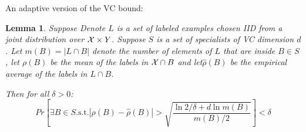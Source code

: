 \documentclass{article}
\newtheorem{lemma}[theorem]{Lemma}
\newcommand{\X}{{\cal X}}
\newcommand{\emprho}{\hat{\rho}}
\begin{document}
An adaptive version of the VC bound:
\begin{lemma}
Suppose Denote $L$ is a set of labeled examples chosen IID from a
joint distribution over $\X \times Y$. Suppose $S$ is a set of
specialists of VC dimension $d$.
Let $m(B)=|L \cap B|$ denote the number of elements of $L$ that are
inside $B \in S$, let $\rho(B)$ be the mean of the labels in $\X \cap B$ and
let$\emprho(B)$ be the empirical average of the labels in $L \cap B$. 

Then for all $\delta>0$:
$$
Pr\left[ \exists B\in S \text{.s.t.}  |\rho(B) - \emprho(B)| >
  \sqrt{\frac{\ln 2/\delta+d \ln m(B)}{m(B)/2}} \right] < \delta
$$
\end{lemma}
\end{document}
